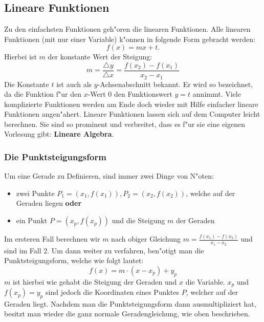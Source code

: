 \subsection{Lineare Funktionen}
Zu den einfachsten Funktionen geh"oren die linearen Funktionen. Alle linearen Funktionen (mit nur einer Variable) k"onnen in folgende Form gebracht werden: 
\begin{equation*}
f(x) = mx+t.
\end{equation*}
Hierbei ist $m$ der konstante Wert der Steigung:
\begin{equation*}
m= \frac{\triangle y}{\triangle x}=\frac{f(x_2)-f(x_1)}{x_2-x_1}
\end{equation*}
Die Konstante $t$ ist auch als $y$-Achsenabschnitt bekannt. Er wird so bezeichnet, da die Funktion f"ur den $x$-Wert $0$ den Funktionswert $y = t$ annimmt. Viele komplizierte Funktionen werden am Ende doch wieder mit Hilfe einfacher lineare Funktionen angen"ahert. Lineare Funktionen lassen sich auf dem Computer leicht berechnen. Sie sind so prominent und verbreitet, dass es f"ur sie eine eigenen Vorlesung gibt: \textbf{Lineare Algebra}.


\subsubsection{Die Punktsteigungsform}
Um eine Gerade zu Definieren, sind immer zwei Dinge von N"oten:
\begin{itemize}
\item zwei Punkte $P_1 = (x_1, f(x_1)), P_2 = (x_2, f(x_2))$, welche auf der Geraden liegen \textbf{oder}
\item ein Punkt $P = (x_p, f(x_p))$ und die Steigung $m$ der Geraden
\end{itemize}
Im ersteren Fall berechnen wir $m$ nach obiger Gleichung $m = \frac{f(x_1) - f(x_2)}{x_1 - x_2}$ und sind im Fall 2. Um dann weiter zu verfahren, ben"otigt man die Punktsteigungsform, welche wie folgt lautet:
\begin{equation*}
f(x) = m \cdot (x-x_p) + y_p
\end{equation*}
$m$ ist hierbei wie gehabt die Steigung der Geraden und $x$ die Variable. $x_p$ und $f(x_p) = y_p$ sind jedoch die Koordinaten eines Punktes $P$, welcher auf der Geraden liegt. Nachdem man die Punktsteigungsform dann ausmultipliziert hat, besitzt man wieder die ganz normale Geradengleichung, wie oben beschrieben.


